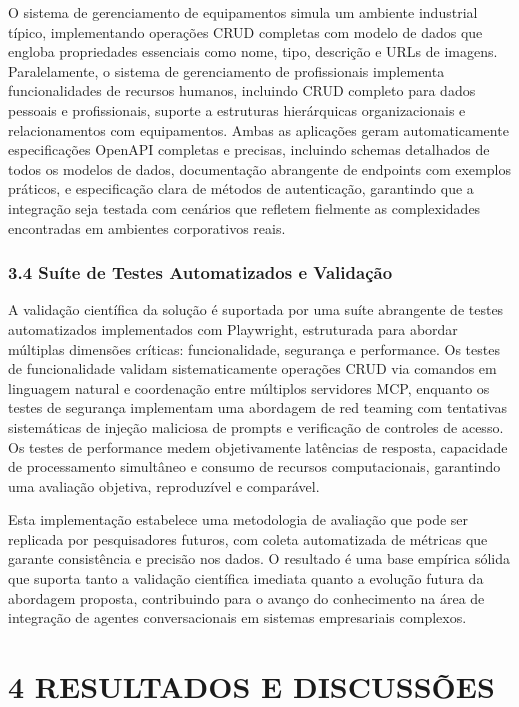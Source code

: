 \documentclass[
]{article}
\begin{document}
O sistema de gerenciamento de equipamentos simula um ambiente industrial
típico, implementando operações CRUD completas com modelo de dados que
engloba propriedades essenciais como nome, tipo, descrição e URLs de
imagens. Paralelamente, o sistema de gerenciamento de profissionais
implementa funcionalidades de recursos humanos, incluindo CRUD completo
para dados pessoais e profissionais, suporte a estruturas hierárquicas
organizacionais e relacionamentos com equipamentos. Ambas as aplicações
geram automaticamente especificações OpenAPI completas e precisas,
incluindo schemas detalhados de todos os modelos de dados, documentação
abrangente de endpoints com exemplos práticos, e especificação clara de
métodos de autenticação, garantindo que a integração seja testada com
cenários que refletem fielmente as complexidades encontradas em
ambientes corporativos reais.

\subsubsection{3.4 Suíte de Testes Automatizados e
Validação}\label{suuxedte-de-testes-automatizados-e-validauxe7uxe3o}

A validação científica da solução é suportada por uma suíte abrangente
de testes automatizados implementados com Playwright, estruturada para
abordar múltiplas dimensões críticas: funcionalidade, segurança e
performance. Os testes de funcionalidade validam sistematicamente
operações CRUD via comandos em linguagem natural e coordenação entre
múltiplos servidores MCP, enquanto os testes de segurança implementam
uma abordagem de red teaming com tentativas sistemáticas de injeção
maliciosa de prompts e verificação de controles de acesso. Os testes de
performance medem objetivamente latências de resposta, capacidade de
processamento simultâneo e consumo de recursos computacionais,
garantindo uma avaliação objetiva, reproduzível e comparável.

Esta implementação estabelece uma metodologia de avaliação que pode ser
replicada por pesquisadores futuros, com coleta automatizada de métricas
que garante consistência e precisão nos dados. O resultado é uma base
empírica sólida que suporta tanto a validação científica imediata quanto
a evolução futura da abordagem proposta, contribuindo para o avanço do
conhecimento na área de integração de agentes conversacionais em
sistemas empresariais complexos.

\section{4 RESULTADOS E DISCUSSÕES}\label{resultados-e-discussuxf5es}
\end{document}
